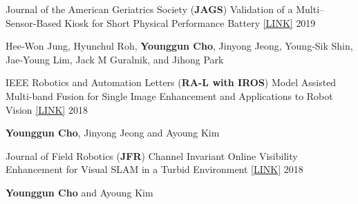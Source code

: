 \begin{cventries}
  \cventry
    {Journal of the American Geriatrics Society (\textbf{JAGS})} %
    {Validation of a Multi–Sensor‐Based Kiosk for Short Physical Performance Battery \href{https://onlinelibrary.wiley.com/doi/abs/10.1111/jgs.16135}{[LINK]}} %
    { } %
    {2019} %
    {
      \begin{cvitems} %
        \item {Hee‐Won Jung, Hyunchul Roh, \textbf{Younggun Cho}, Jinyong Jeong, Young‐Sik Shin, Jae‐Young Lim, Jack M Guralnik, and Jihong Park}
      \end{cvitems}
    }

  \cventry
    {IEEE Robotics and Automation Letters (\textbf{RA-L with IROS})} %
    {Model Assisted Multi-band Fusion for Single Image Enhancement and Applications to Robot Vision
    \href{http://irap.kaist.ac.kr/publications/ycho-2018-ral.pdf}{[LINK]}} %
    { } %
    {2018} %
    {
      \begin{cvitems} %
        \item {\textbf{Younggun Cho}, Jinyong Jeong and Ayoung Kim}
      \end{cvitems}
    }

  \cventry
    {Journal of Field Robotics (\textbf{JFR})} %
    {Channel Invariant Online Visibility Enhancement for Visual SLAM in a Turbid Environment \href{http://irap.kaist.ac.kr/publications/ycho-2018-jfr.pdf}{[LINK]}} %
    { } %
    {2018} %
    {
      \begin{cvitems} %
        \item {\textbf{Younggun Cho} and Ayoung Kim}
      \end{cvitems}
    }
\end{cventries}




